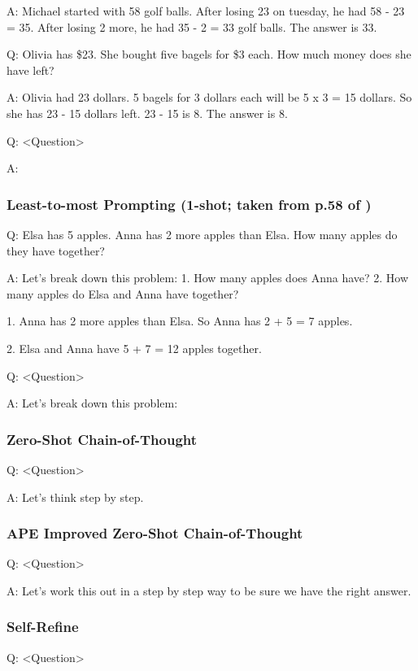 \documentclass[11pt]{article}
\begin{document}
A: Michael started with 58 golf balls. After losing 23 on tuesday, he had 58 - 23 = 35. After losing 2 more, he had 35 - 2 = 33 golf balls. The answer is 33.

Q: Olivia has \$23. She bought five bagels for \$3 each. How much money does she have left?

A: Olivia had 23 dollars. 5 bagels for 3 dollars each will be 5 x 3 = 15 dollars. So she has 23 - 15 dollars left. 23 - 15 is 8. The answer is 8.

Q: <Question>

A:

\subsubsection*{Least-to-most Prompting (1-shot; taken from p.58 of \citealp{zhou_least--most_2023})}

Q: Elsa has 5 apples. Anna has 2 more apples than Elsa. How many apples do they have together?

A: Let's break down this problem: 1. How many apples does Anna have? 2. How many apples do Elsa and Anna have together?

1. Anna has 2 more apples than Elsa. So Anna has 2 + 5 = 7 apples.

2. Elsa and Anna have 5 + 7 = 12 apples together.

Q: <Question>

A: Let's break down this problem:

\subsubsection*{Zero-Shot Chain-of-Thought}

Q: <Question>

A: Let's think step by step.

\subsubsection*{APE Improved Zero-Shot Chain-of-Thought}

Q: <Question>

A: Let's work this out in a step by step way to be sure we have the right answer.

\subsubsection*{Self-Refine}

Q: <Question>
\end{document}
